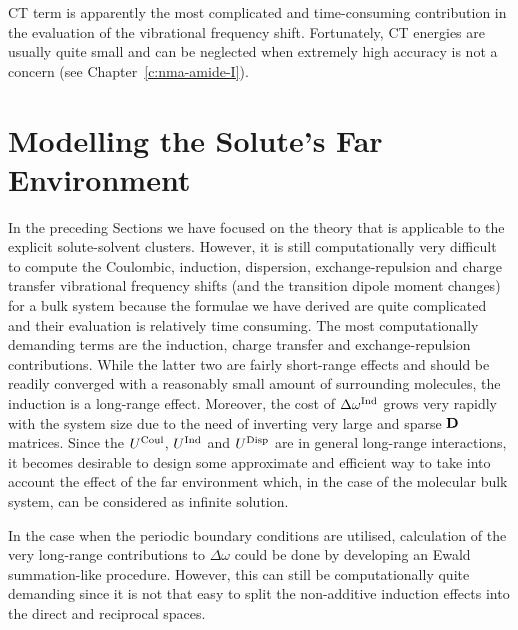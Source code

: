 \documentclass[a4paper,titlepage,twoside,fleqn,12pt]{book}
\begin{document}
\begin{refsection}
CT term is apparently the most complicated and time\hyp{}consuming contribution
in the evaluation of the vibrational frequency shift.
Fortunately, CT energies are usually quite small
and can be neglected when extremely high accuracy is not
a concern (see Chapter~\ref{c:nma-amide-I}).

\section{Modelling the Solute's Far Environment\label{s:far-environ}}

In the preceding Sections we have focused on the
theory that is applicable to the explicit solute\hyp{}solvent
clusters. However, it is still computationally very difficult 
to compute the Coulombic, induction, dispersion, exchange\hyp{}repulsion
and charge transfer vibrational frequency shifts (and the transition dipole moment changes)
for a bulk system because the formulae we have derived are quite
complicated and their evaluation is relatively time consuming. The most computationally
demanding terms are the induction, charge transfer and exchange\hyp{}repulsion contributions.
While the latter two are fairly short\hyp{}range effects
and should be readily converged with a reasonably small amount of
surrounding molecules, the induction is a long\hyp{}range effect. Moreover,
the cost of $\Delta\omega^{\rm Ind}$ grows very rapidly with the system size
due to the need of inverting very large and sparse $\bf D$ matrices.
Since the $U^{\rm Coul}$, $U^{\rm Ind}$ and $U^{\rm Disp}$
are in general long\hyp{}range interactions, it becomes desirable
to design some approximate and efficient way to take into account the
effect of the far environment which, in the case of the molecular bulk 
system, can be considered as infinite solution.

In the case when the periodic boundary conditions are utilised, 
calculation of the very long\hyp{}range contributions to $\Delta\omega$ 
could be done by developing an Ewald summation\hyp{}like procedure.
However, this can still be computationally quite demanding since it is
not that easy to split the non\hyp{}additive induction effects
into the direct and reciprocal spaces.


\end{refsection}
\end{document}
